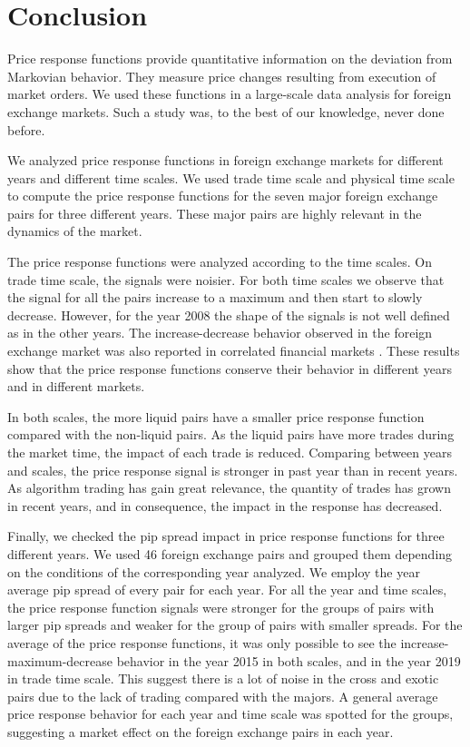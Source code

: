 \section{Conclusion}\label{sec:conclusion}

Price response functions provide quantitative information on the deviation
from Markovian behavior. They measure price changes resulting from execution of
market orders. We used these functions in a large-scale data analysis for
foreign exchange markets. Such a study was, to the best of our knowledge, never
done before.

We analyzed price response functions in foreign exchange markets for different
years and different time scales. We used trade time scale and physical time
scale to compute the price response functions for the seven major foreign
exchange pairs for three different years. These major pairs are highly relevant
in the dynamics of the market.

The price response functions were analyzed according to the time scales. On
trade time scale, the signals were noisier. For both time scales we observe
that the signal for all the pairs increase to a maximum and then start to
slowly decrease. However, for the year 2008 the shape of the signals is not
well defined as in the other years. The increase-decrease behavior observed in
the foreign exchange market was also reported in correlated financial markets
\cite{my_paper_response_financial,Wang_2016_avg}. These results show that
the price response functions conserve their behavior in different years and in
different markets.

In both scales, the more liquid pairs have a smaller price response function
compared with the non-liquid pairs. As the liquid pairs have more trades during
the market time, the impact of each trade is reduced. Comparing between years
and scales, the price response signal is stronger in past year than in recent
years. As algorithm trading has gain great relevance, the quantity of trades
has grown in recent years, and in consequence, the impact in the response has
decreased.

Finally, we checked the pip spread impact in price response functions for three
different years. We used 46 foreign exchange pairs and grouped them depending
on the conditions of the corresponding year analyzed. We employ the year
average pip spread of every pair for each year. For all the year and time
scales, the price response function signals were stronger for the groups of
pairs with larger pip spreads and weaker for the group of pairs with smaller
spreads. For the average of the price response functions, it was only possible
to see the increase-maximum-decrease behavior in the year 2015 in both scales,
and in the year 2019 in trade time scale. This suggest there is a lot of noise
in the cross and exotic pairs due to the lack of trading compared with the
majors. A general average price response behavior for each year and time scale
was spotted for the groups, suggesting a market effect on the foreign exchange
pairs in each year.

